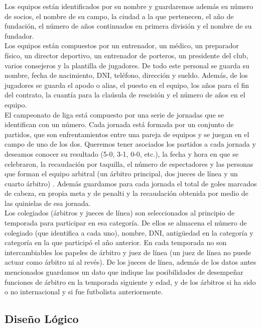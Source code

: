 \documentclass{article}
\begin{document}
Los equipos están identificados por su nombre y guardaremos además su número de socios, el nombre de su campo, la ciudad a la que pertenecen, el año de fundación, el número de años continuados en primera división y el nombre de su fundador. 
\\

Los equipos están compuestos por un entrenador, un médico, un preparador físico, un director deportivo, un entrenador de porteros, un presidente del club, varios consejeros y la plantilla de jugadores. De todo este personal se guarda su nombre, fecha de nacimiento, DNI, teléfono, dirección y sueldo. Además, de los jugadores se guarda el apodo o alias, el puesto en el equipo, los años para el fin del contrato, la cuantía para la claúsula de rescisión y el número de años en el equipo. 
\\

El campeonato de liga está compuesto por una serie de jornadas que se identifican con un número. Cada jornada está formada por un conjunto de partidos, que son enfrentamientos entre una pareja de equipos y se juegan en el campo de uno de los dos. Queremos tener asociados los partidos a cada jornada y deseamos conocer su resultado (5-0, 3-1, 0-0, etc.), la fecha y hora en que se celebraron, la recaudación por taquilla, el número de espectadores y las personas que forman el equipo arbitral (un árbitro principal, dos jueces de línea y un cuarto árbitro) . Además guardamos para cada jornada el total de goles marcados de cabeza, en propia meta y de penalti y la recaudación obtenida por medio de las quinielas de esa jornada. 
\\

Los colegiados (árbitros y jueces de línea) son seleccionados al principio de temporada para participar en esa categoría. De ellos se almacena el número de colegiado (que identifica a cada uno), nombre, DNI, antigüedad en la categoría y categoría en la que participó el año anterior. En cada temporada no son intercambiables los papeles de árbitro y juez de línea (un juez de línea no puede actuar como árbitro ni al revés). De los jueces de línea, además de los datos antes mencionados guardamos un dato que indique las posibilidades de desempeñar funciones de árbitro en la temporada siguiente y edad, y de los árbitros si ha sido o no internacional y si fue futbolista anteriormente. 


\newpage
\subsection{Diseño Lógico}
\end{document}
